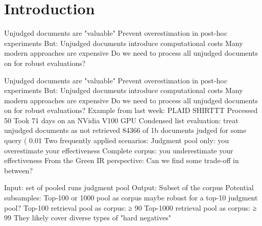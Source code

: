 \section{Introduction}

Unjudged documents are "valuable"
Prevent overestimation in post-hoc experiments
But: Unjudged documents introduce computational costs
Many modern approaches are expensive
Do we need to process all unjudged documents on for robust evaluations?




Unjudged documents are "valuable"
Prevent overestimation in post-hoc experiments
But: Unjudged documents introduce computational costs
Many modern approaches are expensive
Do we need to process all unjudged documents on for robust evaluations?
Example from last week: PLAID SHIRTTT
Processed 50%
Took 71 days on an NVidia V100 GPU
Condensed list evaluation: treat unjudged documents as not retrieved
84366 of 1b documents judged for some query ( 0.01%
Two frequently applied scenarios:
Judgment pool only: you overestimate your effectiveness
Complete corpus: you underestimate your effectiveness
From the Green IR perspective: Can we find some trade-off in between?


Input:
set of pooled runs
judgment pool
Output:
Subset of the corpus
Potential subsamples:
Top-100 or 1000 pool as corpus maybe robust for a top-10 judgment pool?
Top-100 retrieval pool as corpus: ≥ 90%
Top-1000 retrieval pool as corpus: ≥ 99%
They likely cover diverse types of "hard negatives"
